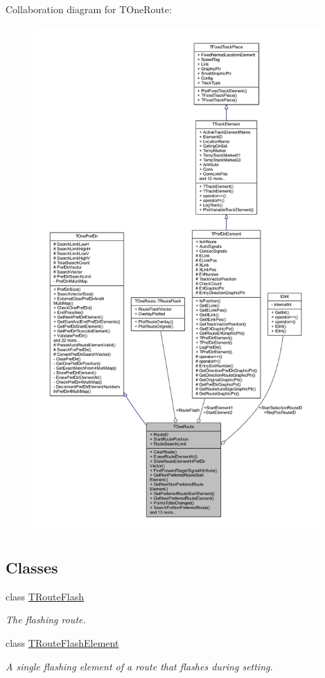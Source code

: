 Collaboration diagram for T\+One\+Route\+:\nopagebreak
\begin{figure}[H]
\begin{center}
\leavevmode
\includegraphics[height=550pt]{class_t_one_route__coll__graph}
\end{center}
\end{figure}
\subsection*{Classes}
\begin{DoxyCompactItemize}
\item 
class \mbox{\hyperlink{class_t_one_route_1_1_t_route_flash}{T\+Route\+Flash}}
\begin{DoxyCompactList}\small\item\em The flashing route. \end{DoxyCompactList}\item 
class \mbox{\hyperlink{class_t_one_route_1_1_t_route_flash_element}{T\+Route\+Flash\+Element}}
\begin{DoxyCompactList}\small\item\em A single flashing element of a route that flashes during setting. \end{DoxyCompactList}\end{DoxyCompactItemize}
